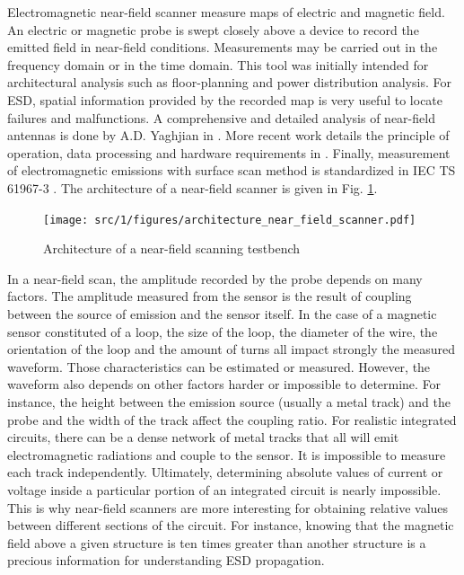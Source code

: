 Electromagnetic near-field scanner measure maps of electric and magnetic field.
An electric or magnetic probe is swept closely above a device to record the emitted field in near-field conditions.
Measurements may be carried out in the frequency domain or in the time domain.
This tool was initially intended for architectural analysis such as floor-planning and power distribution analysis.
For ESD, spatial information provided by the recorded map is very useful to locate failures and malfunctions.
A comprehensive and detailed analysis of near-field antennas is done by A.D. Yaghjian in \cite{nfsFirstStudy}.
More recent work details the principle of operation, data processing and hardware requirements in \cite{near-field-scan, planarNFSAntenna, NFSMeasurements, NFScanner}.
Finally, measurement of electromagnetic emissions with surface scan method is standardized in IEC TS 61967-3 \cite{iec61967}.
The architecture of a near-field scanner is given in Fig. \ref{fig:near-field-scanner}.

\begin{figure}[!h]
  \centering
  \texttt{[image: src/1/figures/architecture\_near\_field\_scanner.pdf]}
  \caption{Architecture of a near-field scanning testbench}
  \label{fig:near-field-scanner}
\end{figure}


In a near-field scan, the amplitude recorded by the probe depends on many factors.
The amplitude measured from the sensor is the result of coupling between the source of emission and the sensor itself.
In the case of a magnetic sensor constituted of a loop, the size of the loop, the diameter of the wire, the orientation of the loop and the amount of turns all impact strongly the measured waveform.
Those characteristics can be estimated or measured.
However, the waveform also depends on other factors harder or impossible to determine.
For instance, the height between the emission source (usually a metal track) and the probe and the width of the track affect the coupling ratio.
For realistic integrated circuits, there can be a dense network of metal tracks that all will emit electromagnetic radiations and couple to the sensor.
It is impossible to measure each track independently.
Ultimately, determining absolute values of current or voltage inside a particular portion of an integrated circuit is nearly impossible.
This is why near-field scanners are more interesting for obtaining relative values between different sections of the circuit.
For instance, knowing that the magnetic field above a given structure is ten times greater than another structure is a precious information for understanding ESD propagation.

